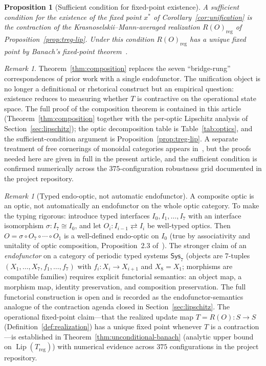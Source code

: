 \documentclass[11pt,a4paper]{article}
\theoremstyle{plain}
\newtheorem{proposition}[theorem]{Proposition}
\theoremstyle{definition}
\theoremstyle{remark}
\newtheorem{remark}[theorem]{Remark}
\DeclareMathOperator{\Lip}{Lip}
\begin{document}
\begin{proposition}[Sufficient condition for fixed-point existence]
\label{prop:sufficient}
A sufficient condition for the existence of the fixed point
$x^{*}$ of Corollary~\ref{cor:unification} is the contraction of the
Krasnoselskii--Mann-averaged realization
$R(O)_{\mathrm{reg}}$ of Proposition~\ref{prop:treg-lip}. Under this
condition $R(O)_{\mathrm{reg}}$ has a unique fixed point by Banach's
fixed-point theorem~\cite{banach1922}.
\end{proposition}

\begin{remark}
Theorem~\ref{thm:composition} replaces the seven ``bridge-rung''
correspondences of prior work with a single endofunctor. The
unification object is no longer a definitional or rhetorical construct
but an empirical question: existence reduces to measuring whether $T$
is contractive on the operational state space. The full proof of the composition theorem is
contained in this article (Theorem~\ref{thm:composition} together
with the per-optic Lipschitz analysis of
Section~\ref{sec:lipschitz}); the optic decomposition table is
Table~\ref{tab:optics}, and the sufficient-condition argument is
Proposition~\ref{prop:treg-lip}. A separate treatment of
free cornerings of monoidal categories appears
in~\cite{riley2023}, but the proofs needed here are given in full
in the present article, and the sufficient condition is confirmed
numerically across the $375$-configuration robustness grid
documented in the project repository.
\end{remark}

\begin{remark}[Typed endo-optic, not automatic endofunctor]
\label{rem:typed-optic}
A composite optic is an optic, not automatically an endofunctor on the
whole optic category. To make the typing rigorous: introduce typed
interfaces $I_0, I_1, \ldots, I_7$ with an interface isomorphism
$\sigma : I_7 \cong I_0$, and let $O_i : I_{i-1} \rightleftarrows I_i$
be well-typed optics. Then $O = \sigma \circ O_7 \circ \cdots \circ O_1$
is a well-defined endo-optic on $I_0$ (true by associativity and
unitality of optic composition, Proposition~2.3 of~\cite{riley2018optics}).
The stronger claim of an \emph{endofunctor} on a category of periodic
typed systems $\mathsf{Sys}_7$ (objects are 7-tuples
$(X_1, \ldots, X_7, f_1, \ldots, f_7)$ with $f_i : X_i \to X_{i+1}$
and $X_8 = X_1$; morphisms are compatible families) requires explicit
functorial semantics: an object map, a morphism map, identity
preservation, and composition preservation. The full functorial
construction is open and is recorded as
the endofunctor-semantics analogue of the contraction agenda closed
in Section~\ref{sec:lipschitz}. The operational fixed-point claim---that the
realized update map $T = R(O) : S \to S$ (Definition~\ref{def:realization})
has a unique fixed point whenever $T$ is a contraction---is established
in Theorem~\ref{thm:unconditional-banach} (analytic upper bound on
$\Lip(T_{\mathrm{reg}})$) with numerical
evidence across $375$ configurations in the project repository.
\end{remark}
\end{document}
